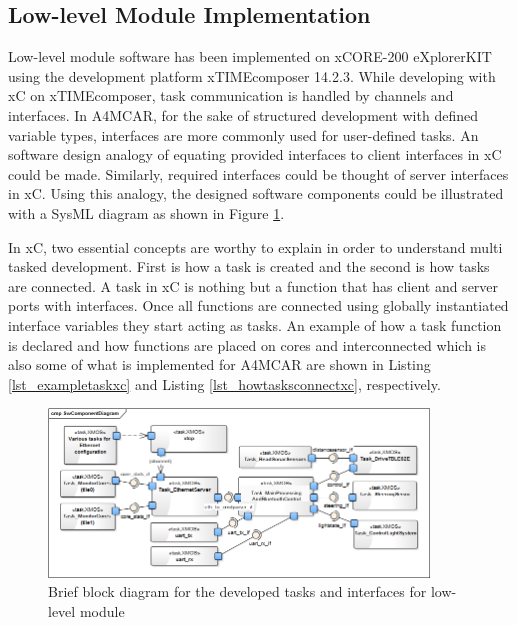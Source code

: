 \subsection{Low-level Module Implementation}
Low-level module software has been implemented on xCORE-200 eXplorerKIT using the development platform xTIMEcomposer 14.2.3. While developing with xC on xTIMEcomposer, task communication is handled by channels and interfaces. In A4MCAR, for the sake of structured development with defined variable types, interfaces are more commonly used for user-defined tasks. An software design analogy of equating provided interfaces to client interfaces in xC could be made. Similarly, required interfaces could be thought of server interfaces in xC. Using this analogy, the designed software components could be illustrated with a SysML \cite{sysml} diagram as shown in Figure \ref{fig:sysmlxmostasksbrief}.

In xC, two essential concepts are worthy to explain in order to understand multi tasked development. First is how a task is created and the second is how tasks are connected. A task in xC is nothing but a function that has client and server ports with interfaces. Once all functions are connected using globally instantiated interface variables they start acting as tasks. An example of how a task function is declared and how functions are placed on cores and interconnected which is also some of what is implemented for A4MCAR are shown in Listing \ref{lst_exampletaskxc} and Listing \ref{lst_howtasksconnectxc}, respectively.


\begin{figure}[!ht]
	\centering
	\includegraphics[width=0.9\textwidth]{content/images/sysmlxmostasksbrief.png}
	\caption{Brief block diagram for the developed tasks and interfaces for low-level module}
	\label{fig:sysmlxmostasksbrief}
\end{figure}



